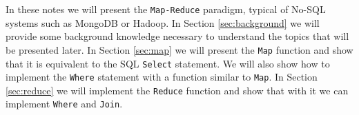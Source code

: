 In these notes we will present the \texttt{Map-Reduce} paradigm, typical of No-SQL systems such as MongoDB or Hadoop. In Section \ref{sec:background} we will provide some background knowledge necessary to understand the topics that will be presented later. In Section \ref{sec:map} we will present the \texttt{Map} function and show that it is equivalent to the SQL \texttt{Select} statement. We will also show how to implement the \texttt{Where} statement with a function similar to \texttt{Map}. In Section \ref{sec:reduce} we will implement the \texttt{Reduce} function and show that with it we can implement \texttt{Where} and \texttt{Join}.
